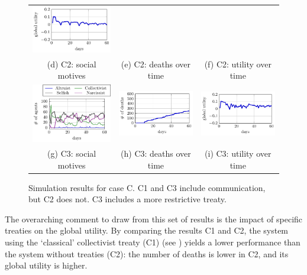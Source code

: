\begin{figure}[htb]
\begin{tabular}{ccc}
    \includegraphics[width=0.3\linewidth]{008_team_6_agent_design/C/C4_utility.pdf}\\[0pt]
    (d) C2: social motives & (e) C2: deaths over time & (f) C2: utility over time \\[8pt]
    \includegraphics[width=0.3\linewidth]{008_team_6_agent_design/C/C5_SM.pdf} &   \includegraphics[width=0.3\linewidth]{008_team_6_agent_design/C/C5_deaths.pdf} &
    \includegraphics[width=0.3\linewidth]{008_team_6_agent_design/C/C5_utility.pdf}\\[0pt]
    (g) C3: social motives & (h) C3: deaths over time & (i) C3: utility over time \\[8pt]
    \end{tabular}
    \caption{Simulation results for case C. C1 and C3 include communication, but C2 does not. C3 includes a more restrictive treaty.}
    \label{fig:res_C}%
\end{figure}





The overarching comment to draw from this set of results is the impact of specific treaties on the global utility. By comparing the results C1 and C2, the system using the `classical' collectivist treaty (C1) (see ) yields a lower performance than the system without treaties (C2): the number of deaths is lower in C2, and its global utility is higher.

